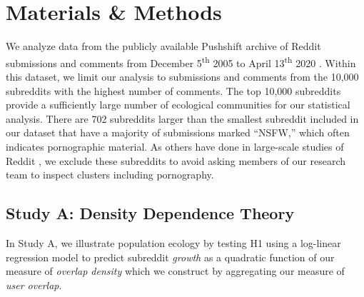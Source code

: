 \documentclass[letterpaper]{article}\usepackage[]{graphicx}\usepackage[]{color}
\begin{document}
\section{Materials \& Methods}
\label{sec:methods}





We analyze data from the publicly available Pushshift archive of Reddit submissions and comments from December 5\textsuperscript{th} 2005 to April 13\textsuperscript{th} 2020
\cite{baumgartner_pushshift_2020}. Within this dataset, we limit our analysis to submissions and comments from the 10,000 subreddits with the highest number of comments. The top 10,000 subreddits provide a sufficiently large number of ecological communities for our statistical analysis. There are 702 subreddits larger than the smallest subreddit included in our dataset that have a majority of submissions marked ``NSFW,'' which often indicates pornographic material. As others have done in large-scale studies of Reddit \cite[e.g.,][]{datta_identifying_2017}, we exclude these subreddits to avoid asking members of our research team to inspect clusters including pornography. 

 

\subsection{Study A: Density Dependence Theory} %
\label{methods:density}

In Study A, we illustrate population ecology by testing H1 using a log-linear regression model to predict subreddit \textit{growth} as a quadratic function of our measure of \emph{overlap density} which we construct by aggregating our measure of \emph{user overlap}. 
\vspace{0.8em} 
\end{document}
